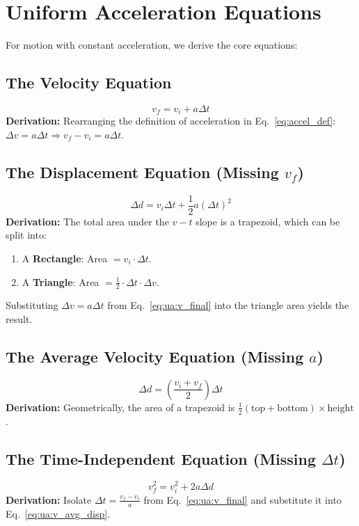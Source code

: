 \documentclass{article}
\begin{document}
\newpage
\section{Uniform Acceleration Equations}

For motion with constant acceleration, we derive the core equations:

\subsection{The Velocity Equation}
\begin{equation}
  v_f = v_i + a\Delta t
  \label{eq:ua:v_final}
\end{equation}
\textbf{Derivation:} Rearranging the definition of acceleration in Eq.~\eqref{eq:accel_def}: $\Delta v = a\Delta t \Rightarrow v_f - v_i = a\Delta t$.

\subsection{The Displacement Equation (Missing \texorpdfstring{$v_f$}{v\_f})}
\begin{equation}
  \Delta d = v_i \Delta t + \frac{1}{2}a(\Delta t)^2
  \label{eq:ua:disp_1}
\end{equation}
\textbf{Derivation:} The total area under the $v-t$ slope is a trapezoid, which can be split into:
\begin{enumerate}
  \item A \textbf{Rectangle}: Area $= v_i \cdot \Delta t$.
  \item A \textbf{Triangle}: Area $= \frac{1}{2} \cdot \Delta t \cdot \Delta v$.
\end{enumerate}
Substituting $\Delta v = a\Delta t$ from Eq.~\eqref{eq:ua:v_final} into the triangle area yields the result.

\subsection{The Average Velocity Equation (Missing \texorpdfstring{$a$}{a})}
\begin{equation}
  \Delta d = \left( \frac{v_i + v_f}{2} \right) \Delta t
  \label{eq:ua:v_avg_disp}
\end{equation}
\textbf{Derivation:} Geometrically, the area of a trapezoid is $\frac{1}{2}(\text{top} + \text{bottom}) \times \text{height}$.

\subsection{The Time-Independent Equation (Missing \texorpdfstring{$\Delta t$}{Delta t})}
\begin{equation}
  v_f^2 = v_i^2 + 2a\Delta d
  \label{eq:ua:time_indep}
\end{equation}
\textbf{Derivation:} Isolate $\Delta t = \frac{v_f - v_i}{a}$ from Eq.~\eqref{eq:ua:v_final} and substitute it into Eq.~\eqref{eq:ua:v_avg_disp}.
\end{document}
